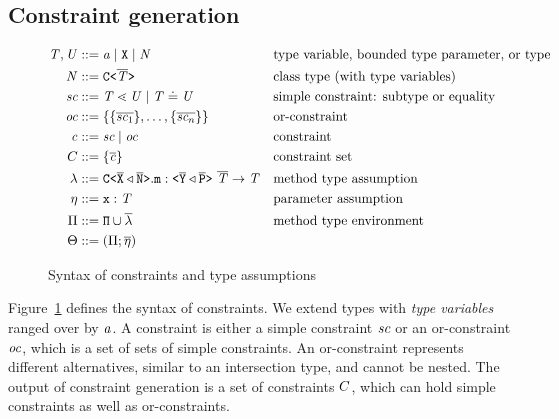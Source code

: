 \documentclass[a4paper,USenglish,cleveref, autoref, thm-restate]{lipics-v2021}
\begin{document}
\subsection{Constraint generation}
\label{sec:fjtype}
\begin{figure}[tp]
  \begin{align*}
    \mathit{T}, \mathit{U} &::= \mathit{ a } \mid {\tt X} \mid {\ensuremath{\mathit{N}}} && \text{type variable, bounded type parameter, or type}\\
    \mathit{N} &::= \mathtt{C \texttt{<} \overline{\mathit{T}} \texttt{>} } && \text{class type (with type variables)} \\
    \textit{sc} &::= \mathit{T} \lessdot \mathit{U} \mid \mathit{T} \doteq \mathit{U} && \text{simple constraint: subtype or equality}\\
    \textit{oc}{} &::= \{ \{ \overline{\textit{sc}_1} \}, \ldots, \{ \overline{\textit{sc}_n} \} \} && \text{or-constraint}\\
    \mathit{c} &::= \textit{sc} \mid \textit{oc} && \text{constraint}\\
    C &::= \{ \mathit{\overline{c}} \} && \text{constraint set}\\
    \mathtt{\lambda} &::= \mathtt{C \texttt{<} \overline{\tt X} \triangleleft \overline{\tt N} \texttt{>} }.\texttt{m} : \mathtt{ \texttt{<} \overline{\tt Y}
                        \triangleleft \overline{\tt P} \texttt{>} }\ \overline{\tt \mathit{T}} \to \mathit{T}  &&
                                                                \text{method
                                                                type assumption}\\
    \mathtt{\eta} &::= \texttt{x} : \mathit{T} && \text{parameter
                                                       assumption}\\
    \Pi & ::= {\tt \Pi} \cup \overline{\mathtt{\lambda}} &
                & \text{method type environment} \\
    \Theta &::= ({\Pi} ; \overline{\mathtt{\eta}}) 
  \end{align*}
  \caption{Syntax of constraints and type assumptions}
  \label{fig:syntax-constraints}
\end{figure}

Figure~\ref{fig:syntax-constraints} defines the syntax of
constraints. We extend types with \emph{type variables} ranged over by
$\mathit{ a }$. A constraint is either a simple constraint $\textit{sc}$ or
an or-constraint $\textit{oc}$, which is a set of sets of simple
constraints. An or-constraint represents different alternatives,
similar to an intersection type, and
cannot be nested. The output of constraint generation is a set of
constraints $C$, which can hold simple constraints as well as or-constraints.
\end{document}
